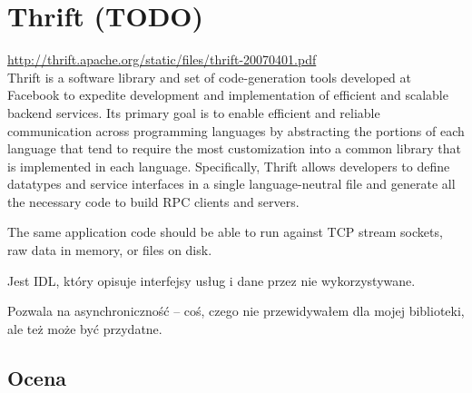 \section{Thrift (TODO)}
\url{http://thrift.apache.org/static/files/thrift-20070401.pdf}\\

Thrift is a software library and set of code-generation tools developed
at Facebook to expedite development and implementation of
efficient and scalable backend services. Its primary goal is to enable
efficient and reliable communication across programming languages
by abstracting the portions of each language that tend to
require the most customization into a common library that is implemented
in each language. Specifically, Thrift allows developers to
define datatypes and service interfaces in a single language-neutral
file and generate all the necessary code to build RPC clients and
servers.

The same application code should be able to run against TCP stream sockets, raw data in memory, or files on disk.

Jest IDL, który opisuje interfejsy usług i dane przez nie wykorzystywane.

Pozwala na asynchroniczność -- coś, czego nie przewidywałem dla mojej biblioteki, ale też może być przydatne.


\subsection{Ocena}


